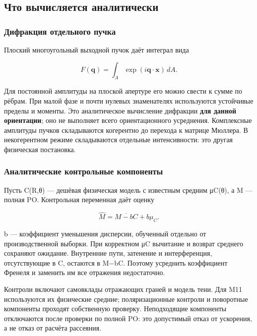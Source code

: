 \subsection{Что вычисляется
аналитически}\label{ux447ux442ux43e-ux432ux44bux447ux438ux441ux43bux44fux435ux442ux441ux44f-ux430ux43dux430ux43bux438ux442ux438ux447ux435ux441ux43aux438}

\subsubsection{Дифракция отдельного
пучка}\label{ux434ux438ux444ux440ux430ux43aux446ux438ux44f-ux43eux442ux434ux435ux43bux44cux43dux43eux433ux43e-ux43fux443ux447ux43aux430}

Плоский многоугольный выходной пучок даёт интеграл вида

\[F(\mathbf q)=\int_A\exp(i\mathbf q\cdot\mathbf x)\,dA.\]

Для постоянной амплитуды на плоской апертуре его можно свести к сумме по
рёбрам. При малой фазе и почти нулевых знаменателях используются
устойчивые пределы и моменты. Это аналитическое вычисление дифракции
\textbf{для данной ориентации}; оно не выполняет всего ориентационного
усреднения. Комплексные амплитуды пучков складываются когерентно до
перехода к матрице Мюллера. В некогерентном режиме складываются
отдельные интенсивности: это другая физическая постановка.

\subsubsection{Аналитические контрольные
компоненты}\label{ux430ux43dux430ux43bux438ux442ux438ux447ux435ux441ux43aux438ux435-ux43aux43eux43dux442ux440ux43eux43bux44cux43dux44bux435-ux43aux43eux43cux43fux43eux43dux435ux43dux442ux44b}

Пусть C(R,θ) --- дешёвая физическая модель с известным средним μC(θ), а
M --- полная PO. Контрольная переменная даёт оценку

\[\widehat M=\overline{M-bC}+b\mu_C.\]

b --- коэффициент уменьшения дисперсии, обученный отдельно от
производственной выборки. При корректном μC вычитание и возврат среднего
сохраняют ожидание. Внутренние пути, затенение и интерференция,
отсутствующие в C, остаются в M−bC. Поэтому усреднить коэффициент
Френеля и заменить им все отражения недостаточно.

Контроли включают самовклады отражающих граней и модель тени. Для M11
используются их физические средние; поляризационные контроли и
поворотные компоненты проходят собственную проверку. Неподходящие
компоненты отключаются после проверки по полной PO: это допустимый отказ
от ускорения, а не отказ от расчёта рассеяния.

